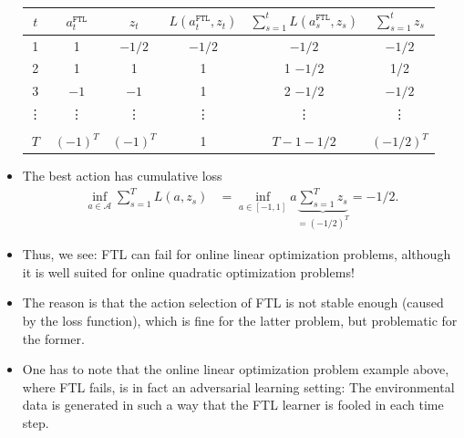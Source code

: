 \documentclass[11pt,compress,t,notes=noshow, xcolor=table]{beamer}
\renewcommand{\l}{L}
\newcommand{\Aspace}{\mathcal{A}}
\newcommand{\FTL}{\texttt{FTL}}
\begin{document}
\begin{vbframe}
\begin{itemize}
		\begin{centering}
			 \begin{tabular}{c|c|c|c|c|c} 
				$t$ & $a_t^{\FTL}$ & $z_t$ & $\l(a_t^{\FTL},z_t)$  &  $\sum_{s=1}^t \l(a_s^{\FTL},z_s)$ & $\sum_{s=1}^t z_s $ \\
				\hline
				1 & 1 & $-1/2$ & $-1/2$ & $-1/2$ & $-1/2$  \\
				\hline
				2 & 1 & 1 & 1 & 1 $- 1/2$ & 1/2 \\
				\hline
				3 & $-1$ & $-1$ & 1 & 2 $- 1/2$ & $-1/2$ \\
				\hline
				\vdots & \vdots & \vdots & \vdots & \vdots & \vdots \\
				\hline 
				& & & & &\\
				$T$ & $(-1)^T$ & $(-1)^T$ & 1 & $T-1-1/2$ & $(-1/2)^{T}$ \\
			\end{tabular}
		\end{centering}
%		 
		\item The best action has cumulative loss 		
%		
		\begin{align*}
			\inf_{a \in \Aspace} \sum\nolimits_{s=1}^T \l(a,z_s) &= \inf_{a \in [-1,1]} a \underbrace{\sum\nolimits_{s=1}^T  z_s}_{=(-1/2)^{T}} = -1/2.
		\end{align*}
		\small
%		
		 \item Thus, we see: FTL can fail for {\color{red} online linear optimization problems}, although it is well suited for {\color{blue}  online quadratic optimization problems}!
		 \item The reason is that the action selection of FTL is not stable enough (caused by the loss function), which is fine for {\color{blue} the latter problem}, but problematic for {\color{red} the former}.
		\item One has to note that the online linear optimization problem example above, where FTL fails, is in fact an adversarial learning setting: The environmental data is generated in such a way that the FTL learner is fooled in each time step.
%		
	\end{itemize}
\end{vbframe}
\end{document}
